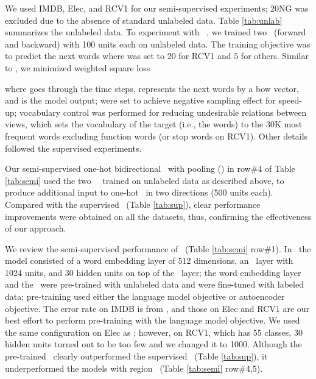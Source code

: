 \documentclass{article}
\begin{document}
We used IMDB, Elec, and RCV1 for our semi-supervised experiments; 
20NG was excluded due to the absence of standard unlabeled data.  
Table \ref{tab:unlab} summarizes the unlabeled data. 
To experiment with \lstm\ \tvEmbs, 
we trained two \lstms\ (forward and backward) with 100 units each on unlabeled data. 
The training objective was 
to predict the next  words where  was set to 20 for RCV1 and 5 for others.  
Similar to \JZb, 
we minimized weighted square loss 
\newcommand{\lossWei}{\alpha}
 
where  goes through the time steps, 
 represents the next  words by a bow vector, 
and  is the model output; 
 were set to achieve negative sampling effect for speed-up; 
vocabulary control was performed 
for reducing undesirable relations between views, which 
sets the vocabulary of the target (i.e., the  words) to the 30K most frequent words 
excluding function words (or stop words on RCV1). 
Other details followed the supervised experiments. 

Our semi-supervised one-hot bidirectional \lstm\ with pooling (\ohBiLstm) 
in row\#4 of Table \ref{tab:semi} used the two \lstm\ \tvEmbs\ 
trained on unlabeled data 
as described above, 
to produce additional input to 
one-hot \lstms\ in two directions (500 units each). 
Compared with the supervised \ohBiLstm\ (Table \ref{tab:sup}), 
clear performance improvements were obtained on all the datasets, 
thus, confirming the effectiveness of 
our approach. 


We review the semi-supervised performance of \wvLstms\ (Table \ref{tab:semi} row\#1). 
In \DLa\ 
the model consisted of a word embedding layer of 
512 dimensions, an \lstm\ layer with 1024 units, and 30 hidden units on top of the \lstm\ layer; 
the word embedding layer and the \lstm\ were pre-trained with unlabeled data and were fine-tuned with labeled data; 
pre-training used 
either the language model objective or autoencoder objective. 
The error rate on IMDB is from \DLa, and those on Elec and RCV1 are our best effort to 
perform pre-training with the language model objective.  We used the same configuration on Elec as \DLa; 
however, on RCV1, which has 55 classes, 
30 hidden units turned out to be too few and we changed it to 1000. 
Although the pre-trained \wvLstm\ clearly outperformed the supervised \wvLstm\ (Table \ref{tab:sup}), 
it underperformed
the models with region \tvEmbs\ (Table \ref{tab:semi} row\#4,5).  
\end{document}

